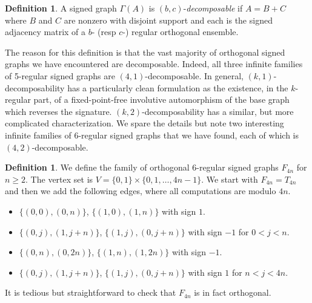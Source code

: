 \documentclass[11pt]{article}
\theoremstyle{plain}
\theoremstyle{definition}
\newtheorem{definition}[theorem]{Definition}
\begin{document}
\begin{definition}
A signed graph $\Gamma(A)$ is $(b,c)$-\emph{decomposable} if
$A = B + C$ where $B$ and $C$ are nonzero with disjoint support and each is the signed adjacency matrix of a $b$- (resp $c$-) regular orthogonal ensemble.
\end{definition}

The reason for this definition is that the vast majority of orthogonal signed graphs we have encountered are decomposable. Indeed, all three infinite families of 5-regular signed graphs are $(4,1)$-decomposable. In general, $(k,1)$-decomposability has a particularly clean formulation as the existence, in the $k$-regular part, of a fixed-point-free involutive automorphism of the base graph which reverses the signature. $(k,2)$-decomposability has a similar, but more complicated characterization. We spare the details but note two interesting infinite families of 6-regular signed graphs that we have found, each of which is $(4,2)$-decomposable.


\begin{definition}\label{defF8n}
We define the  family of orthogonal $6$-regular signed graphs $F_{4n}$ for $n\geqslant 2$. The vertex set is $V=\{0,1\}\times\{0,1,\ldots,4n-1\}$.
We start with  $F_{4n}=T_{4n}$ and  then  we  add the following edges, where all computations are modulo $4n$.
\begin{itemize}
\item[$\bullet$] $\{(0,0),(0,n)\}$,  $\{(1,0),(1,n)\}$  with sign $1$.
\item[$\bullet$] $\{(0,j),(1,j+n)\}$,  $\{(1,j),(0,j+n)\}$  with sign $-1$ for $0<j<n$.
\item[$\bullet$] $\{(0,n),(0,2n)\}$,  $\{(1,n),(1,2n)\}$  with sign $-1$.
\item[$\bullet$] $\{(0,j),(1,j+n)\}$,  $\{(1,j),(0,j+n)\}$  with sign $1$ for $n<j<4n$.
\end{itemize}
It is tedious but straightforward to check that $F_{4n}$ is in fact orthogonal.
\end{definition}
\end{document}
